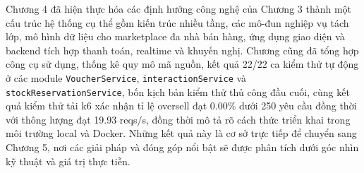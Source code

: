 \documentclass[../DoAn.tex]{subfiles}
\begin{document}
Chương 4 đã hiện thực hóa các định hướng công nghệ của Chương 3 thành một cấu trúc hệ thống cụ thể gồm kiến trúc nhiều tầng, các mô-đun nghiệp vụ tách lớp, mô hình dữ liệu cho marketplace đa nhà bán hàng, ứng dụng giao diện và backend tích hợp thanh toán, realtime và khuyến nghị. Chương cũng đã tổng hợp công cụ sử dụng, thống kê quy mô mã nguồn, kết quả 22/22 ca kiểm thử tự động ở các module \texttt{VoucherService}, \texttt{interactionService} và \texttt{stockReservationService}, bốn kịch bản kiểm thử thủ công đầu cuối, cùng kết quả kiểm thử tải k6 xác nhận tỉ lệ oversell đạt $0.00\%$ dưới 250 yêu cầu đồng thời với thông lượng đạt 19.93 reqs/s, đồng thời mô tả rõ cách thức triển khai trong môi trường local và Docker. Những kết quả này là cơ sở trực tiếp để chuyển sang Chương 5, nơi các giải pháp và đóng góp nổi bật sẽ được phân tích dưới góc nhìn kỹ thuật và giá trị thực tiễn.
\end{document}
